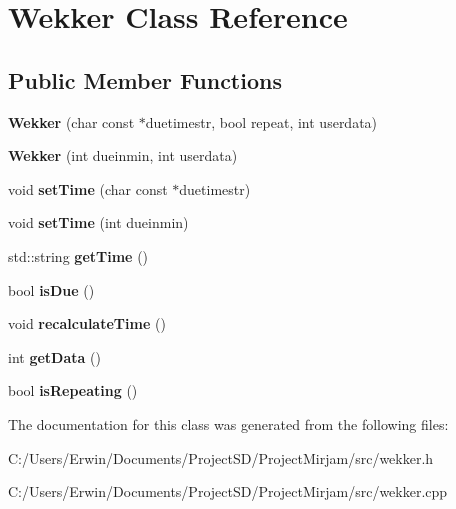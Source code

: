 \hypertarget{class_wekker}{}\section{Wekker Class Reference}
\label{class_wekker}
\subsection*{Public Member Functions}
\begin{DoxyCompactItemize}
\item 
\hypertarget{class_wekker_a430abbc87ca880cddbf18b89c07aabe8}{}{\bfseries Wekker} (char const $\ast$duetimestr, bool repeat, int userdata)\label{class_wekker_a430abbc87ca880cddbf18b89c07aabe8}

\item 
\hypertarget{class_wekker_a16083e8bda81545ec6abb84eb8a933e4}{}{\bfseries Wekker} (int dueinmin, int userdata)\label{class_wekker_a16083e8bda81545ec6abb84eb8a933e4}

\item 
\hypertarget{class_wekker_ad22f1f5fbd543892690cc94bd1b586f5}{}void {\bfseries set\+Time} (char const $\ast$duetimestr)\label{class_wekker_ad22f1f5fbd543892690cc94bd1b586f5}

\item 
\hypertarget{class_wekker_a0a6ca8af43c1525e66ccfeace3da5d7b}{}void {\bfseries set\+Time} (int dueinmin)\label{class_wekker_a0a6ca8af43c1525e66ccfeace3da5d7b}

\item 
\hypertarget{class_wekker_a1386592e7c4f638cfee0f922bb5e03ab}{}std\+::string {\bfseries get\+Time} ()\label{class_wekker_a1386592e7c4f638cfee0f922bb5e03ab}

\item 
\hypertarget{class_wekker_a99ffd9a102d8c591749ac17aed52fb0f}{}bool {\bfseries is\+Due} ()\label{class_wekker_a99ffd9a102d8c591749ac17aed52fb0f}

\item 
\hypertarget{class_wekker_abbafe0b0a3f660d85b30fb923707ed48}{}void {\bfseries recalculate\+Time} ()\label{class_wekker_abbafe0b0a3f660d85b30fb923707ed48}

\item 
\hypertarget{class_wekker_adb34df213d2ea19760e81c5bb2594540}{}int {\bfseries get\+Data} ()\label{class_wekker_adb34df213d2ea19760e81c5bb2594540}

\item 
\hypertarget{class_wekker_a53428c73d0b3c1fae67ee38687f2aac0}{}bool {\bfseries is\+Repeating} ()\label{class_wekker_a53428c73d0b3c1fae67ee38687f2aac0}

\end{DoxyCompactItemize}


The documentation for this class was generated from the following files\+:\begin{DoxyCompactItemize}
\item 
C\+:/\+Users/\+Erwin/\+Documents/\+Project\+S\+D/\+Project\+Mirjam/src/wekker.\+h\item 
C\+:/\+Users/\+Erwin/\+Documents/\+Project\+S\+D/\+Project\+Mirjam/src/wekker.\+cpp\end{DoxyCompactItemize}
